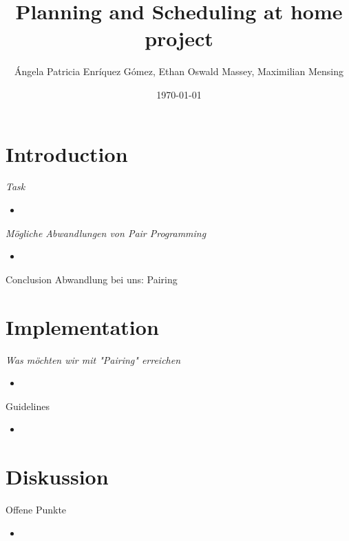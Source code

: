 \documentclass{beamer}
\title{Planning and Scheduling at home project}
\date{\today}
\author{\'{A}ngela Patricia Enr\'{i}quez G\'{o}mez, Ethan Oswald Massey, Maximilian Mensing}
\institute{BRSU}
\begin{document}
\maketitle


\section{Introduction}

\begin{frame}{\textsl{ Task }}

\begin{itemize}
	\item 
\end{itemize}

\end{frame}

\begin{frame}{\textsl{M\"ogliche Abwandlungen von Pair Programming}}
	  
	\begin{itemize}
		\item 
	\end{itemize}


\begin{alertblock}{Conclusion}
	Abwandlung bei uns: Pairing
\end{alertblock}
\end{frame}


\section{Implementation}

\begin{frame}{\textsl{ Was m\"ochten wir mit "Pairing" erreichen}}
	\begin{itemize}
		\item 
	\end{itemize}

\end{frame}




\begin{frame}{Guidelines}
\begin{itemize}
	\item
\end{itemize}
\end{frame}


\section{Diskussion}

\begin{frame}{Offene Punkte}
\begin{itemize}

	\item 
\end{itemize}
\end{frame}




\begin{frame}{}

\end{frame}


%
\end{document}
